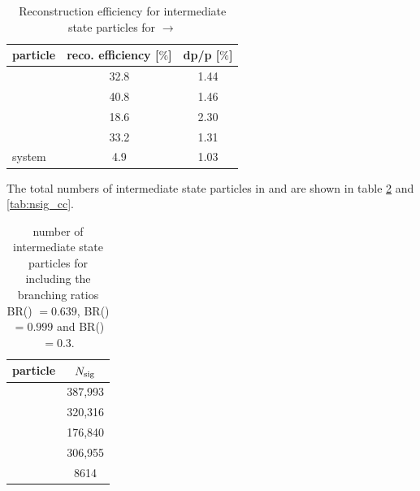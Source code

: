 		\begin{table}
		\centering
		\caption{\propose Reconstruction efficiency for intermediate state particles for \pbarp $\rightarrow$ \excitedanticascade \cascade}
		\label{tab:intermediatestate_efficiency_cc}
		
		\begin{tabular}{lcc}
		
			\hline
			particle & reco. efficiency [$\%$] & dp/p [$\%$] \\\hline
			\hline
			\lam & 32.8 &   1.44 \\
			\alam & 40.8 &   1.46\\
			\cascade & 18.6&   2.30\\
			\excitedanticascade & 33.2&   1.31\\
			\excitedanticascade \cascade system & 4.9&   1.03\\\hline
			 	
		\end{tabular}
	\end{table}
	The total numbers of intermediate state particles in \mychannel and \myccchannel are shown in table \ref{tab:nsig} and \ref{tab:nsig_cc}. 
	
	\begin{table}
		\centering
		\caption{\propose number of intermediate state particles for \mychannel including the branching ratios BR() $=0.639$, BR(\decay{\cascade}{\lam}{\piminus})
		 $= 0.999$ and BR(\decay{\excitedcascade}{\lam}{\kminus}) $ =0.3$.}
		 \label{tab:nsig}
		 
		 \begin{tabular}{lc}
		 	\hline
		 	particle & $N_{\textnormal{sig}}$ \\\hline
		 	\hline
		 	\lam & 387,993 \\
		 	\alam & 320,316 \\
		 	\anticascade & 176,840 \\
		 	\excitedcascade & 306,955 \\
		 	\excitedcascade \anticascade &  8614\\\hline
		 	
		 \end{tabular}
	\end{table}
	 
